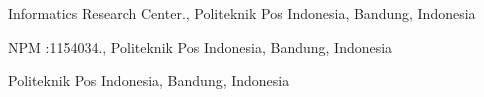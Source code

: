  Informatics Research Center., Politeknik Pos Indonesia, Bandung,
Indonesia

 NPM :1154034., Politeknik Pos Indonesia, Bandung,
Indonesia

 Politeknik Pos Indonesia, Bandung,
Indonesia

